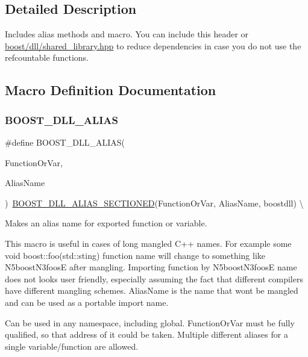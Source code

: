 \subsection{Detailed Description}
Includes alias methods and macro. You can include this header or \hyperlink{a00269}{boost/dll/shared\+\_\+library.\+hpp} to reduce dependencies in case you do not use the refcountable functions. 



\subsection{Macro Definition Documentation}
\mbox{\label{a00200_ad9f8b1de81ae3b24cd938c7bacb27eef}} 
\subsubsection{\texorpdfstring{B\+O\+O\+S\+T\+\_\+\+D\+L\+L\+\_\+\+A\+L\+I\+AS}{BOOST\_DLL\_ALIAS}}
{\footnotesize\ttfamily \#define B\+O\+O\+S\+T\+\_\+\+D\+L\+L\+\_\+\+A\+L\+I\+AS(\begin{DoxyParamCaption}\item[{}]{Function\+Or\+Var,  }\item[{}]{Alias\+Name }\end{DoxyParamCaption})~\hyperlink{a00200_af10683bc3be11abe1957b186fcec2bd2}{B\+O\+O\+S\+T\+\_\+\+D\+L\+L\+\_\+\+A\+L\+I\+A\+S\+\_\+\+S\+E\+C\+T\+I\+O\+N\+ED}(Function\+Or\+Var, Alias\+Name, boostdll)       \textbackslash{}}



Makes an alias name for exported function or variable. 

This macro is useful in cases of long mangled C++ names. For example some {\ttfamily void boost\+::foo(std\+::sting)} function name will change to something like {\ttfamily N5boost\+N3foosE} after mangling. Importing function by {\ttfamily N5boost\+N3foosE} name does not looks user friendly, especially assuming the fact that different compilers have different mangling schemes. Alias\+Name is the name that won\textquotesingle{}t be mangled and can be used as a portable import name.

Can be used in any namespace, including global. Function\+Or\+Var must be fully qualified, so that address of it could be taken. Multiple different aliases for a single variable/function are allowed.

